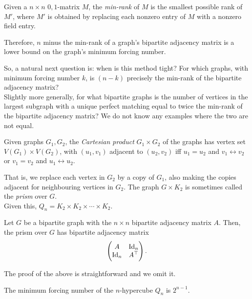 \begin{fdef}
	Given a $n \times n$ $0,1$-matrix $M$, the \emph{min-rank} of $M$ is the smallest possible rank of $M'$, where $M'$ is obtained by replacing each nonzero entry of $M$ with a nonzero field entry.
\end{fdef}

Therefore, $n$ minus the min-rank of a graph's bipartite adjacency matrix is a lower bound on the graph's minimum forcing number.

So, a natural next question is: when is this method tight? For which graphs, with minimum forcing number $k$, is $(n-k)$ precisely the min-rank of the bipartite adjacency matrix?\\
Slightly more generally, for what bipartite graphs is the number of vertices in the largest subgraph with a unique perfect matching equal to twice the min-rank of the bipartite adjacency matrix? We do not know any examples where the two are not equal.


\begin{fdef}
	Given graphs $G_1,G_2$, the \emph{Cartesian product} $G_1 \times G_2$ of the graphs has vertex set $V(G_1) \times V(G_2)$, with $(u_1,v_1)$ adjacent to $(u_2,v_2)$ iff $u_1 = u_2$ and $v_1 \leftrightarrow v_2$ or $v_1 = v_2$ and $u_1 \leftrightarrow u_2$.
\end{fdef}

That is, we replace each vertex in $G_2$ by a copy of $G_1$, also making the copies adjacent for neighbouring vertices in $G_2$. The graph $G \times K_2$ is sometimes called the \emph{prism} over $G$.\\
Given this, $Q_n = K_2 \times K_2 \times \cdots \times K_2$.

\begin{flem}
	Let $G$ be a bipartite graph with the $n \times n$ bipartite adjacency matrix $A$. Then, the prism over $G$ has bipartite adjacency matrix
	\[ \begin{pmatrix} A & \operatorname{Id}_n \\ \operatorname{Id}_n & A^\top \end{pmatrix}. \]
\end{flem}
The proof of the above is straightforward and we omit it.

\begin{ftheo}
	\label{theo:hypercube-forcing}
	The minimum forcing number of the $n$-hypercube $Q_n$ is $2^{n-1}$.
\end{ftheo}

